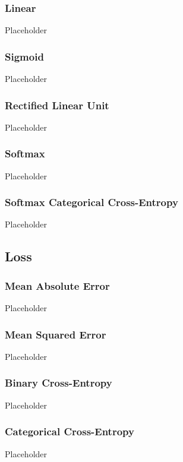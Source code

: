 \documentclass[a4paper]{article}
\begin{document}
\subsubsection*{Linear}
Placeholder

\subsubsection*{Sigmoid}
Placeholder

\subsubsection*{Rectified Linear Unit}
Placeholder

\subsubsection*{Softmax}
Placeholder

\subsubsection*{Softmax Categorical Cross-Entropy}
Placeholder

\subsection*{Loss}
\subsubsection*{Mean Absolute Error}
Placeholder

\subsubsection*{Mean Squared Error}
Placeholder

\subsubsection*{Binary Cross-Entropy}
Placeholder

\subsubsection*{Categorical Cross-Entropy}
Placeholder
\end{document}
